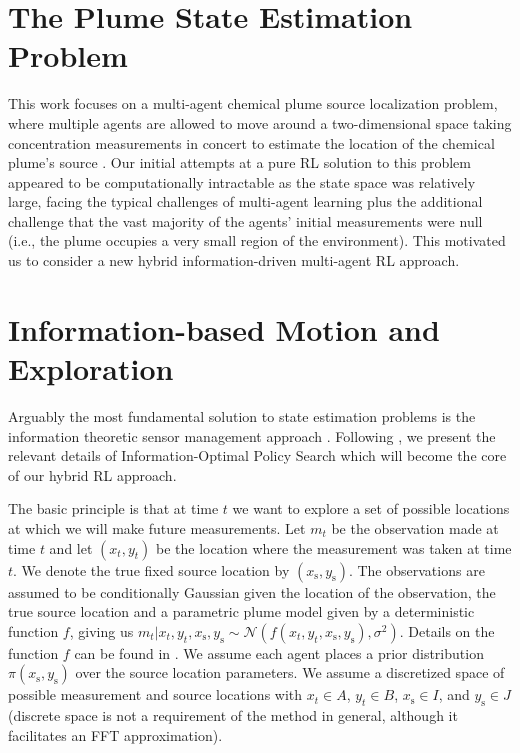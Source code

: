 \documentclass[letterpaper]{article} %
\begin{document}
\section{The Plume State Estimation Problem}
This work focuses on a multi-agent chemical plume source localization problem, where multiple agents are allowed to move around a two-dimensional space taking concentration measurements in concert to estimate the location of the chemical plume's source \cite[see][for more details]{schmidt2019sequential}.
Our initial attempts at a pure RL solution to this problem appeared to be computationally intractable as the state space was relatively large, facing the typical challenges of multi-agent learning \cite[e.g.,][]{vinyals2019grandmaster} plus the additional challenge that the vast majority of the agents' initial measurements were null (i.e., the plume occupies a very small region of the environment).
This motivated us to consider a new hybrid information-driven multi-agent RL approach.

\section{Information-based Motion and Exploration}
Arguably the most fundamental solution to state estimation problems is the information theoretic sensor management approach \cite{hero2008infotheory}.
Following \cite{hero2007foundations}, we present the relevant details of Information-Optimal Policy Search which will become the core of our hybrid RL approach.

The basic principle is that at time $t$ we want to explore a set of possible locations at which we will make future measurements. Let  $m_{t}$ be the observation made at time $t$ and let $(x_{t},y_{t})$ be the location where the measurement was taken at time $t$. We denote the true fixed source location by $(x_{\text{s}},y_{\text{s}})$. The observations are assumed to be conditionally Gaussian given the location of the observation, the true source location and a parametric plume model given by a deterministic function $f$, giving us $m_t|x_t, y_t, x_{\text{s}}, y_{\text{s}} \sim \mathcal{N}(f(x_t, y_t, x_{\text{s}}, y_{\text{s}}), \sigma^2)$. Details on the function $f$ can be found in \cite{schmidt2019sequential}. We assume each agent places a prior distribution $\pi(x_{\text{s}},y_{\text{s}})$ over the source location parameters.  
We assume a discretized space of possible measurement and source locations with $x_t \in A$, $y_t \in B$, $x_{\text{s}} \in I$, and $y_{\text{s}} \in J$
(discrete space is not a requirement of the method in general, although it facilitates an FFT approximation).
\end{document}
